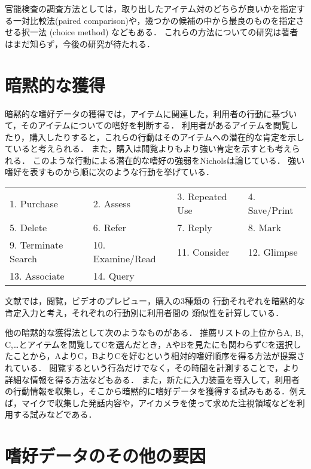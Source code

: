 官能検査の調査方法としては，取り出したアイテム対のどちらが良いかを指定する一対比較法(paired comparison)や，幾つかの候補の中から最良のものを指定させる択一法 (choice method) などもある．
これらの方法についての研究は著者はまだ知らず，今後の研究が待たれる．

\section{暗黙的な獲得}
\label{sec:implicitrating}

暗黙的な嗜好データの獲得では，アイテムに関連した，利用者の行動に基づいて，そのアイテムについての嗜好を判断する．
利用者があるアイテムを閲覧したり，購入したりすると，これらの行動はそのアイテムへの潜在的な肯定を示していると考えられる．
また，購入は閲覧よりもより強い肯定を示すとも考えられる．
このような行動による潜在的な嗜好の強弱をNicholsは論じている\cite{misc:088,ej:048}．
強い嗜好を表すものから順に次のような行動を挙げている．
\begin{center}
\small
\begin{tabular}{llll}
1. Purchase & 2. Assess & 3. Repeated Use & 4. Save/Print \\
5. Delete & 6. Refer & 7. Reply & 8. Mark \\
9. Terminate Search & 10. Examine/Read & 11. Consider & 12. Glimpse \\
13. Associate & 14. Query & &
\end{tabular}
\end{center}
文献\cite{ieeem:07:01}では，閲覧，ビデオのプレビュー，購入の3種類の
行動それぞれを暗黙的な肯定入力と考え，それぞれの行動別に利用者間の
類似性を計算している．

他の暗黙的な獲得法として次のようなものがある．
推薦リストの上位からA, B, C,…とアイテムを閲覧してCを選んだとき，AやBを見たにも関わらずCを選択したことから，AよりC，BよりCを好むという相対的嗜好順序を得る方法\cite{kdd:02:01}が提案されている．
閲覧するという行為だけでなく，その時間を計測することで，より詳細な情報を得る方法などもある．
また，新たに入力装置を導入して，利用者の行動情報を収集し，そこから暗黙的に嗜好データを獲得する試みもある．例えば，マイクで収集した発話内容\cite{trjsai:07:01}や，アイカメラを使って求めた注視領域\cite{trjsai:07:02}などを利用する試みなどである．

\section{嗜好データのその他の要因}
\label{sec:getprefother}

